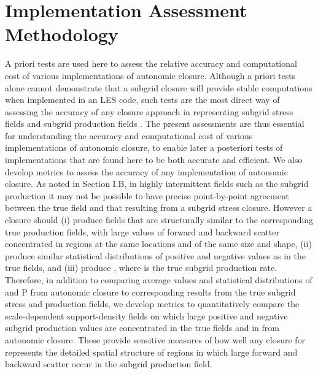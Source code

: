 \graphicspath{ {./Ch4/}  } 

\chapter{Implementation Assessment Methodology}

A priori tests are used here to assess the relative accuracy and computational cost of various implementations of autonomic closure. Although a priori tests alone cannot demonstrate that a subgrid closure will provide stable computations when implemented in an LES code, such tests are the most direct way of assessing the accuracy of any closure approach in representing subgrid stress fields   and subgrid production fields  . The present assessments are thus essential for understanding the accuracy and computational cost of various implementations of autonomic closure, to enable later a posteriori tests of implementations that are found here to be both accurate and efficient. 
We also develop metrics to assess the accuracy of any implementation of autonomic closure. As noted in Section I.B, in highly intermittent fields such as the subgrid production   it may not be possible to have precise point-by-point agreement between the true field and that resulting from a subgrid stress closure. However a closure should (i) produce   fields that are structurally similar to the corresponding true production fields, with large values of forward and backward scatter concentrated in regions at the same locations and of the same size and shape, (ii) produce similar statistical distributions of positive and negative values as in the true   fields, and (iii) produce  , where   is the true subgrid production rate. Therefore, in addition to comparing average values and statistical distributions of  and P from autonomic closure to corresponding results from the true subgrid stress and production fields, we develop metrics to quantitatively compare the scale-dependent support-density fields on which large positive and negative subgrid production values are concentrated in the true   fields and in   from autonomic closure. These provide sensitive measures of how well any closure for   represents the detailed spatial structure of regions in which large forward and backward scatter occur in the subgrid production field.
 
